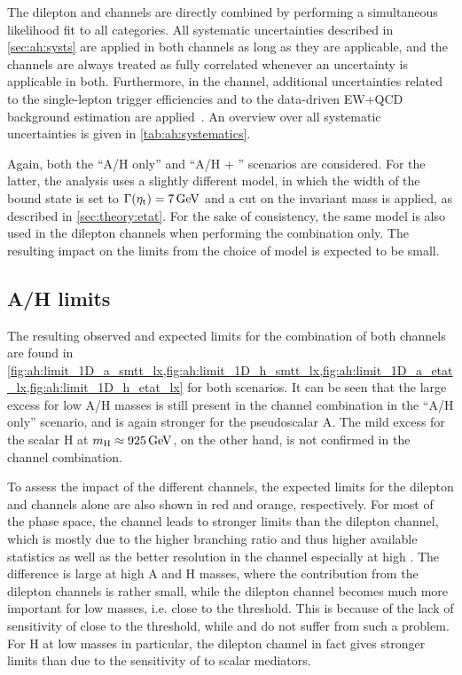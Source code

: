 The dilepton and \ljets channels are directly combined by performing a simultaneous likelihood fit to all categories. All systematic uncertainties described in \cref{sec:ah:systs} are applied in both channels as long as they are applicable, and the channels are always treated as fully correlated whenever an uncertainty is applicable in both. Furthermore, in the \ljets channel, additional uncertainties related to the single-lepton trigger efficiencies and to the data-driven EW+QCD background estimation are applied~\cite{CMS:HIG-22-013}. An overview over all systematic uncertainties is given in \cref{tab:ah:systematics}.

Again, both the ``A/H only'' and ``A/H + \etat'' scenarios are considered. For the latter, the \ljets analysis uses a slightly different \etat model, in which the width of the bound state is set to $\Gammaetat = \SI{7}{\GeV}$ and a cut on the invariant mass \mWWbb is applied, as described in \cref{sec:theory:etat}. For the sake of consistency, the same model is also used in the dilepton channels when performing the combination only. The resulting impact on the limits from the choice of \etat model is expected to be small. 

\subsection{A/H limits}
\label{sec:ah:combinedlimits}

The resulting observed and expected limits for the combination of both channels are found in \cref{fig:ah:limit_1D_a_smtt_lx,fig:ah:limit_1D_h_smtt_lx,fig:ah:limit_1D_a_etat_lx,fig:ah:limit_1D_h_etat_lx} for both scenarios. It can be seen that the large excess for low A/H masses is still present in the channel combination in the ``A/H only'' scenario, and is again stronger for the pseudoscalar A. The mild excess for the scalar H at $\mH \approx \SI{925}{\GeV}$, on the other hand, is not confirmed in the channel combination.

To assess the impact of the different channels, the expected limits for the dilepton and \ljets channels alone are also shown in red and orange, respectively. For most of the phase space, the \ljets channel leads to stronger limits than the dilepton channel, which is mostly due to the higher branching ratio and thus higher available statistics as well as the better \mtt resolution in the \ljets channel especially at high \mtt. The difference is large at high A and H masses, where the contribution from the dilepton channels is rather small, while the dilepton channel becomes much more important for low masses, i.e. close to the \ttbar threshold. This is because of the lack of sensitivity of \abscostl close to the \ttbar threshold, while \chel and \chan do not suffer from such a problem. For H at low masses in particular, the dilepton channel in fact gives stronger limits than \ljets due to the sensitivity of \chan to scalar mediators.

